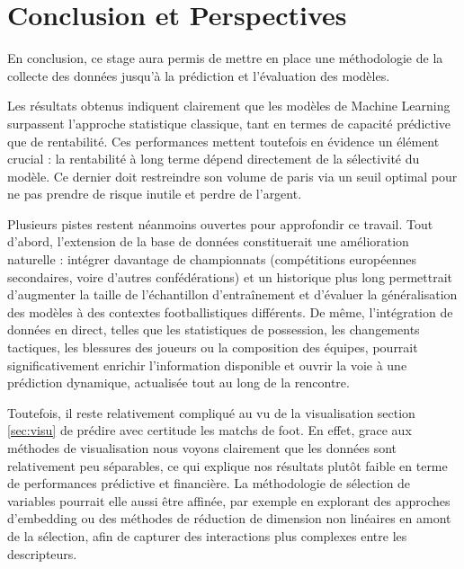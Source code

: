 \section{Conclusion et Perspectives}

En conclusion, ce stage aura permis de mettre en place une méthodologie de la 
collecte des données jusqu'à la prédiction et l'évaluation des modèles. 

Les résultats obtenus indiquent clairement que les modèles de Machine Learning 
surpassent l'approche statistique classique, tant en termes de capacité prédictive 
que de rentabilité. Ces performances mettent toutefois en évidence un élément crucial : 
la rentabilité à long terme dépend directement de la sélectivité du modèle. 
Ce dernier doit restreindre son volume de paris via un seuil optimal pour ne pas 
prendre de risque inutile et perdre de l'argent.

Plusieurs pistes restent néanmoins ouvertes pour approfondir ce 
travail. Tout d'abord, l'extension de la base de données constituerait une amélioration 
naturelle : intégrer davantage de championnats (compétitions européennes secondaires, 
voire d'autres confédérations) et un historique plus long permettrait d'augmenter la 
taille de l'échantillon d'entraînement et d'évaluer la généralisation des modèles à des 
contextes footballistiques différents. De même, l'intégration de données en direct, telles 
que les statistiques de possession, les changements tactiques, les blessures des joueurs ou 
la composition des équipes, pourrait significativement enrichir l'information disponible 
et ouvrir la voie à une prédiction dynamique, actualisée tout au long de la rencontre.

Toutefois, il reste relativement compliqué au vu de la visualisation section \ref{sec:visu} 
de prédire avec certitude les matchs de foot. En effet, grace aux méthodes de visualisation 
nous voyons clairement que les données sont relativement peu séparables, ce qui explique 
nos résultats plutôt faible en terme de performances prédictive et financière. 
La méthodologie de sélection de variables pourrait elle aussi être affinée, par 
exemple en explorant des approches d'embedding ou des méthodes de réduction de dimension 
non linéaires en amont de la sélection, afin de capturer des interactions plus complexes 
entre les descripteurs. 